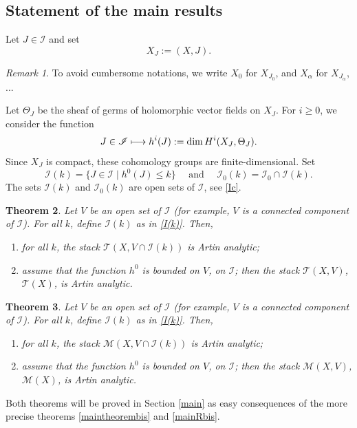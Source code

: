 \documentclass[10pt]{amsart}
\let\mathcal\mathscr
\def\mto{\mathchoice{\longmapsto}{\mapsto}{\mapsto}{\mapsto}}
\theoremstyle{plain}
\newtheorem{theorem}{Theorem}[section]
\theoremstyle{definition}
\theoremstyle{remark}
\newtheorem{remark}[theorem]{Remark}
\numberwithin{equation}{section}
\newcommand{\T}{\mathcal T(X)}
\newcommand{\cI}{\mathcal{I}}
\begin{document}
\subsection{Statement of the main results}
\label{statements}
Let $J\in \cI$ and set
\begin{equation}
\label{XJ}
X_J:=(X,J).
\end{equation}
\begin{remark}
\label{notation}
To avoid cumbersome notations, we write $X_0$ for $X_{J_0}$, and $X_\alpha$ for $X_{J_\alpha}$, ...
\end{remark}
Let $\Theta_J$ be the sheaf of germs of holomorphic vector fields on $X_J$. For $i\geq 0$, we consider the function
\begin{equation}
\label{h(J)}
J\in\cI\mto h^i(J):=\dim H^i(X_J,\Theta_J).
\end{equation}
Since $X_J$ is compact, these cohomology groups are finite-dimensional. Set
\begin{equation}
\label{I(k)}
\cI(k)=\{J\in \cI\mid h^0(J)\leq k\}\quad\text{ and }\quad\cI_0(k)=\cI_0\cap \cI(k).
\end{equation}
The sets $\cI(k)$ and $\cI_0(k)$ are open sets of $\mathcal{I}$, see \eqref{Ic}.
\begin{theorem}
\label{maintheorem}
Let $V$ be an open set of $\cI$ (for example, $V$ is a connected component of $\cI$). For all $k$, define $\cI(k)$ as in \eqref{I(k)}. Then,
\begin{enumerate}
\item
for all $k$, the stack $\mathcal T(X,V\cap \cI(k))$ is Artin analytic;
\item
assume that the function $h^0$ is bounded on $V$, \resp on $\cI$; then the stack $\mathcal T(X,V)$, \resp $\T$, is Artin analytic.
\end{enumerate}
\end{theorem}

\begin{theorem}
\label{mainR}
Let $V$ be an open set of $\cI$ (for example, $V$ is a connected component of $\cI$). For all $k$, define $\cI(k)$ as in \eqref{I(k)}. Then,
\begin{enumerate}
\item
for all $k$, the stack $\mathcal M(X,V\cap \cI(k))$ is Artin analytic;
\item
assume that the function $h^0$ is bounded on $V$, \resp on $\cI$; then the stack $\mathcal M(X,V)$, \resp $\mathcal M(X)$, is Artin analytic.
\end{enumerate}
\end{theorem}
Both theorems will be proved in Section \ref{main} as easy consequences of the more precise theorems \ref{maintheorembis} and \ref{mainRbis}.
\end{document}
